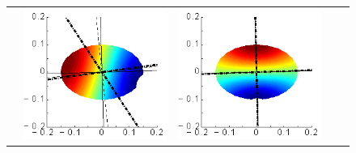 \documentclass[a4paper,11pt]{article}
\begin{document}
\begin{figure}[h]
\begin{tabular*}{1\textwidth}{c|cc|cc|}
\begin{minipage}{0.22\linewidth}
\end{minipage}&
\begin{minipage}{0.22\linewidth}
	\includegraphics[width=1\linewidth]{./images/SAFE/SAFE_CS_15x10_HTI_45/P_a_3_0kHz-pstool.eps}		
\end{minipage}&
\begin{minipage}{0.22\linewidth}
	\includegraphics[width=1\linewidth]{./images/SAFE/SAFE_CS_15x10_HTI_45/P_a_7_2kHz-pstool.eps}		

\end{minipage}
\end{tabular*}
\end{figure}
\end{document}
